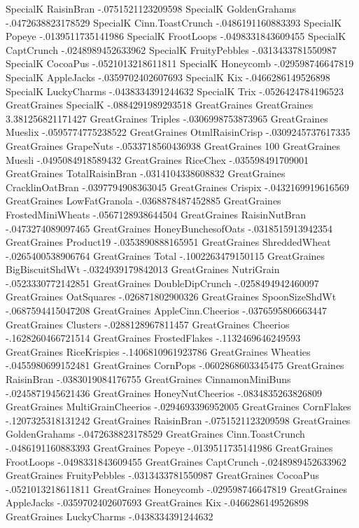 SpecialK	RaisinBran	-.0751521123209598
SpecialK	GoldenGrahams	-.0472638823178529
SpecialK	Cinn.ToastCrunch	-.0486191160883393
SpecialK	Popeye	-.0139511735141986
SpecialK	FrootLoops	-.0498331843609455
SpecialK	CaptCrunch	-.0248989452633962
SpecialK	FruityPebbles	-.0313433781550987
SpecialK	CocoaPus	-.0521013218611811
SpecialK	Honeycomb	-.029598746647819
SpecialK	AppleJacks	-.0359702402607693
SpecialK	Kix	-.0466286149526898
SpecialK	LuckyCharms	-.0438334391244632
SpecialK	Trix	-.0526424784196523
GreatGraines	SpecialK	-.0884291989293518
GreatGraines	GreatGraines	3.381256821171427
GreatGraines	Triples	-.0306998753873965
GreatGraines	Mueslix	-.0595774775238522
GreatGraines	OtmlRaisinCrisp	-.0309245737617335
GreatGraines	GrapeNuts	-.0533718560436938
GreatGraines	100%
GreatGraines	Muesli	-.0495084918589432
GreatGraines	RiceChex	-.035598491709001
GreatGraines	TotalRaisinBran	-.0314104338608832
GreatGraines	CracklinOatBran	-.0397794908363045
GreatGraines	Crispix	-.0432169919616569
GreatGraines	LowFatGranola	-.0368878487452885
GreatGraines	FrostedMiniWheats	-.0567128938644504
GreatGraines	RaisinNutBran	-.0473274089097465
GreatGraines	HoneyBunchesofOats	-.0318515913942354
GreatGraines	Product19	-.0353890888165951
GreatGraines	ShreddedWheat	-.0265400538906764
GreatGraines	Total	-.1002263479150115
GreatGraines	BigBiscuitShdWt	-.0324939179842013
GreatGraines	NutriGrain	-.0523330772142851
GreatGraines	DoubleDipCrunch	-.0258494942460097
GreatGraines	OatSquares	-.026871802900326
GreatGraines	SpoonSizeShdWt	-.0687594415047208
GreatGraines	AppleCinn.Cheerios	-.0376595806663447
GreatGraines	Clusters	-.0288128967811457
GreatGraines	Cheerios	-.1628260466721514
GreatGraines	FrostedFlakes	-.1132469646249593
GreatGraines	RiceKrispies	-.1406810961923786
GreatGraines	Wheaties	-.0455980699152481
GreatGraines	CornPops	-.0602868603345475
GreatGraines	RaisinBran	-.0383019084176755
GreatGraines	CinnamonMiniBuns	-.0245871945621436
GreatGraines	HoneyNutCheerios	-.0834835263826809
GreatGraines	MultiGrainCheerios	-.0294693396952005
GreatGraines	CornFlakes	-.1207325318131242
GreatGraines	RaisinBran	-.0751521123209598
GreatGraines	GoldenGrahams	-.0472638823178529
GreatGraines	Cinn.ToastCrunch	-.0486191160883393
GreatGraines	Popeye	-.0139511735141986
GreatGraines	FrootLoops	-.0498331843609455
GreatGraines	CaptCrunch	-.0248989452633962
GreatGraines	FruityPebbles	-.0313433781550987
GreatGraines	CocoaPus	-.0521013218611811
GreatGraines	Honeycomb	-.029598746647819
GreatGraines	AppleJacks	-.0359702402607693
GreatGraines	Kix	-.0466286149526898
GreatGraines	LuckyCharms	-.0438334391244632
